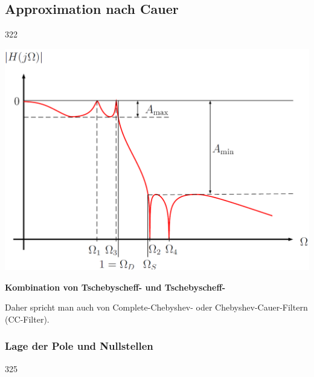 \subsection{Approximation nach Cauer}{322}

\begin{minipage}[c]{0.45\columnwidth}
    \includegraphics[width=\columnwidth]{images/filter_cauer_amplitudengang.png}
\end{minipage}
\hfill
\begin{minipage}[c]{0.48\columnwidth}
    \textbf{Kombination von Tschebyscheff- und Tschebyscheff-}

    Daher spricht man auch von Complete-Chebyshev- oder Chebyshev-Cauer-Filtern (CC-Filter).
\end{minipage}


\subsubsection{Lage der Pole und Nullstellen}{325}

